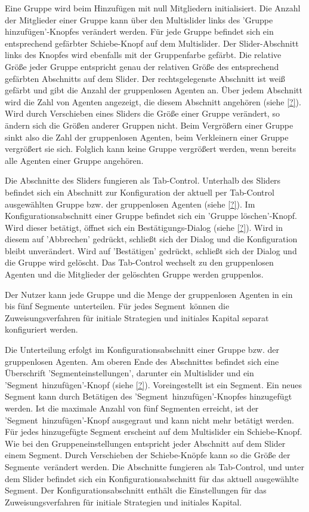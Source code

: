 \documentclass[parskip=full,11pt]{scrartcl}
\def\segment{Segment}
\def\segments{Segmente}
\begin{document}
Eine Gruppe wird beim Hinzufügen mit null Mitgliedern initialisiert. Die Anzahl der Mitglieder einer Gruppe kann über den Multislider links des 'Gruppe hinzufügen'-Knopfes verändert werden. Für jede Gruppe befindet sich ein entsprechend gefärbter Schiebe-Knopf auf dem Multislider. Der Slider-Abschnitt links des Knopfes wird ebenfalls mit der Gruppenfarbe gefärbt. Die relative Größe jeder Gruppe entspricht genau der relativen Größe des entsprechend gefärbten Abschnitts auf dem Slider. Der rechtsgelegenste Abschnitt ist weiß gefärbt und gibt die Anzahl der gruppenlosen Agenten an. Über jedem Abschnitt wird die Zahl von Agenten angezeigt, die diesem Abschnitt angehören (siehe \cref{?}). Wird durch Verschieben eines Sliders die Größe einer Gruppe verändert, so ändern sich die Größen anderer Gruppen nicht. Beim Vergrößern einer Gruppe sinkt also die Zahl der gruppenlosen Agenten, beim Verkleinern einer Gruppe vergrößert sie sich. Folglich kann keine Gruppe vergrößert werden, wenn bereits alle Agenten einer Gruppe angehören.

Die Abschnitte des Sliders fungieren als Tab-Control. Unterhalb des Sliders befindet sich ein Abschnitt zur Konfiguration der aktuell per Tab-Control ausgewählten Gruppe bzw. der gruppenlosen Agenten (siehe \cref{?}). Im Konfigurationsabschnitt einer Gruppe befindet sich ein 'Gruppe löschen'-Knopf. Wird dieser betätigt, öffnet sich ein Bestätigungs-Dialog (siehe \cref{?}). Wird in diesem auf 'Abbrechen' gedrückt, schließt sich der Dialog und die Konfiguration bleibt unverändert. Wird auf 'Bestätigen' gedrückt, schließt sich der Dialog und die Gruppe wird gelöscht. Das Tab-Control wechselt zu den gruppenlosen Agenten und die Mitglieder der gelöschten Gruppe werden gruppenlos.

\functionality{Einteilung von Gruppen in \segments}{fnc:segments}
Der Nutzer kann jede Gruppe und die Menge der gruppenlosen Agenten in ein bis fünf \segments\ unterteilen. Für jedes \segment\ können die Zuweisungsverfahren für initiale Strategien und initiales Kapital separat konfiguriert werden.

Die Unterteilung erfolgt im Konfigurationsabschnitt einer Gruppe bzw. der gruppenlosen Agenten. Am oberen Ende des Abschnittes befindet sich eine Überschrift '\segment einstellungen', darunter ein Multislider und ein '\segment\ hinzufügen'-Knopf (siehe \cref{?}). Voreingestellt ist ein Segment. Ein neues Segment kann durch Betätigen des '\segment\ hinzufügen'-Knopfes hinzugefügt werden. Ist die maximale Anzahl von fünf \segments n erreicht, ist der '\segment\ hinzufügen'-Knopf ausgegraut und kann nicht mehr betätigt werden. Für jedes hinzugefügte Segment erscheint auf dem Multislider ein Schiebe-Knopf. Wie bei den Gruppeneinstellungen entspricht jeder Abschnitt auf dem Slider einem \segment. Durch Verschieben der Schiebe-Knöpfe kann so die Größe der \segments\ verändert werden. Die Abschnitte fungieren als Tab-Control, und unter dem Slider befindet sich ein Konfigurationsabschnitt für das aktuell ausgewählte \segment. Der Konfigurationsabschnitt enthält die Einstellungen für das Zuweisungsverfahren für initiale Strategien und initiales Kapital.
\end{document}

